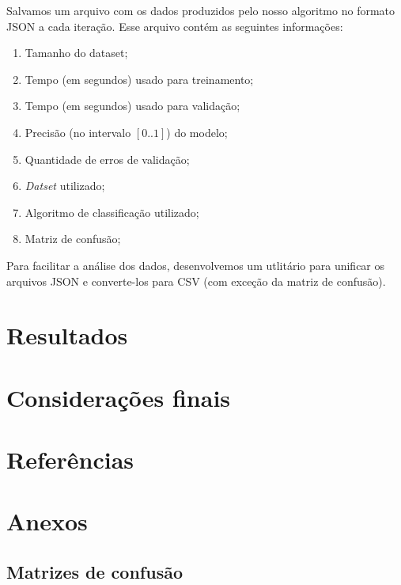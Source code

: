 \documentclass[11pt]{article}
\begin{document}
Salvamos um arquivo com os dados produzidos pelo nosso algoritmo no formato
JSON a cada iteração. Esse arquivo contém as seguintes informações:

\begin{enumerate}
    \item Tamanho do dataset;
    \item Tempo (em segundos) usado para treinamento;
    \item Tempo (em segundos) usado para validação;
    \item Precisão (no intervalo $[0..1]$) do modelo;
    \item Quantidade de erros de validação;
    \item \textit{Datset} utilizado;
    \item Algoritmo de classificação utilizado;
    \item Matriz de confusão;
\end{enumerate}

Para facilitar a análise dos dados, desenvolvemos um utlitário para unificar os
arquivos JSON e converte-los para CSV (com exceção da matriz de confusão).

\section{Resultados}
\section{Considerações finais}
\section{Referências}
\section{Anexos}
\subsection{Matrizes de confusão}
\end{document}
